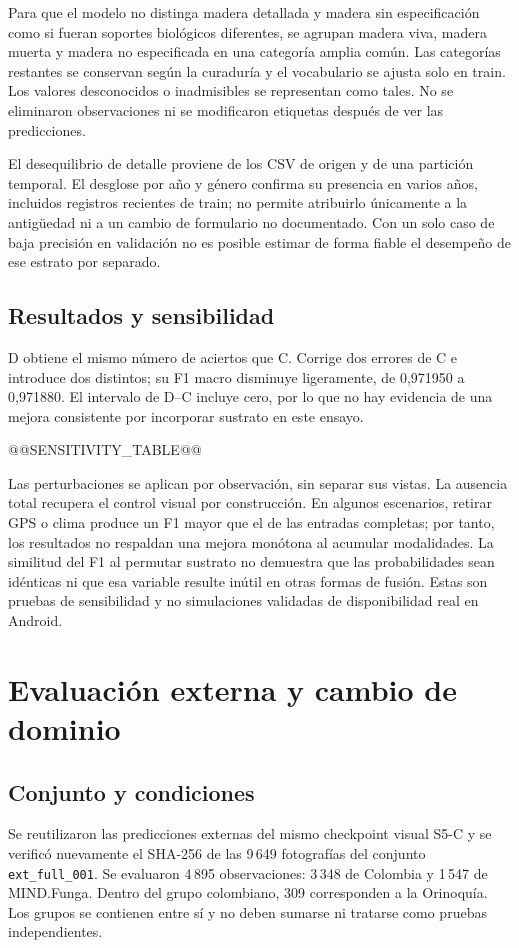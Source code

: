 \documentclass[11pt,a4paper]{article}
\begin{document}
Para que el modelo no distinga madera detallada y madera sin especificación
como si fueran soportes biológicos diferentes, se agrupan madera viva, madera
muerta y madera no especificada en una categoría amplia común. Las categorías
restantes se conservan según la curaduría y el vocabulario se ajusta solo en
train. Los valores desconocidos o inadmisibles se representan como tales.
No se eliminaron observaciones ni se modificaron etiquetas después de ver las
predicciones.

El desequilibrio de detalle proviene de los CSV de origen y de una partición
temporal. El desglose por año y género confirma su presencia en varios años,
incluidos registros recientes de train; no permite atribuirlo únicamente a la
antigüedad ni a un cambio de formulario no documentado. Con un solo caso de
baja precisión en validación no es posible estimar de forma fiable el desempeño
de ese estrato por separado.

\subsection{Resultados y sensibilidad}
D obtiene el mismo número de aciertos que C. Corrige dos errores de C e
introduce dos distintos; su F1 macro disminuye ligeramente, de 0,971950 a
0,971880. El intervalo de D--C incluye cero, por lo que no hay evidencia de
una mejora consistente por incorporar sustrato en este ensayo.

@@SENSITIVITY_TABLE@@

Las perturbaciones se aplican por observación, sin separar sus vistas. La
ausencia total recupera el control visual por construcción. En algunos
escenarios, retirar GPS o clima produce un F1 mayor que el de las entradas
completas; por tanto, los resultados no respaldan una mejora monótona al
acumular modalidades. La similitud del F1 al permutar sustrato no demuestra
que las probabilidades sean idénticas ni que esa variable resulte inútil en
otras formas de fusión. Estas son pruebas de sensibilidad y no simulaciones
validadas de disponibilidad real en Android.

\section{Evaluación externa y cambio de dominio}
\subsection{Conjunto y condiciones}
Se reutilizaron las predicciones externas del mismo checkpoint visual S5-C y
se verificó nuevamente el SHA-256 de las 9\,649 fotografías del conjunto
\texttt{ext\_full\_001}. Se evaluaron 4\,895 observaciones: 3\,348 de
Colombia y 1\,547 de MIND.Funga. Dentro del grupo colombiano, 309 corresponden
a la Orinoquía. Los grupos se contienen entre sí y no deben sumarse ni tratarse
como pruebas independientes.
\end{document}
